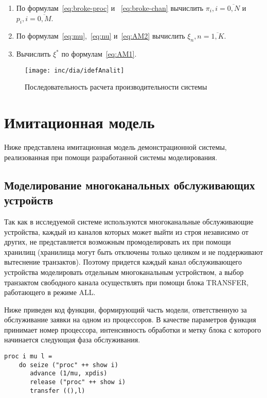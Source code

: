 \begin{enumerate}
\item По формулам~\ref{eq:broke-proc} и ~\ref{eq:broke-chan} вычислить $\pi_i, i=\overline{0,N}$ и $p_i, i=\overline{0,M} $.
\item По формулам~\ref{eq:mu},~\ref{eq:nu} и~\ref{eq:AM2} вычислить $\xi_n, n=\overline{1,K}$.
\item Вычислить $\xi^{*}$ по формулам~\ref{eq:AM1}.
\end{enumerate}


\begin{figure}[ht!]
\centering
\texttt{[image: inc/dia/idefAnalit]}
\caption{Последовательность расчета производительности системы}
\label{fig:idefAnalit}
\end{figure}

\section{Имитационная модель}

Ниже представлена имитационная модель демонстрационной системы, реализованная при помощи разработанной системы моделирования.

\subsection{Моделирование многоканальных обслуживающих устройств}

Так как в исследуемой системе используются многоканальные обслуживающие устройства, каждый из каналов которых может выйти из строя независимо от других, не представляется возможным промоделировать их при помощи хранилищ (хранилища могут быть отключены только целиком и не поддерживают вытеснение транзактов). Поэтому придется каждый канал обслуживающего устройства моделировать отдельным многоканальным устройством, а выбор транзактом свободного канала осуществлять при помощи блока TRANSFER, работающего в режиме ALL.

Ниже приведен код функции, формирующий часть модели, ответственную за обслуживание заявки на одном из процессоров. В качестве параметров функция принимает номер процессора, интенсивность обработки и метку блока с которого начинается следующая фаза обслуживания.

\begin{verbatim}
proc i mu l =
    do seize ("proc" ++ show i)
       advance (1/mu, xpdis)
       release ("proc" ++ show i)
       transfer ((),l)
\end{verbatim}

